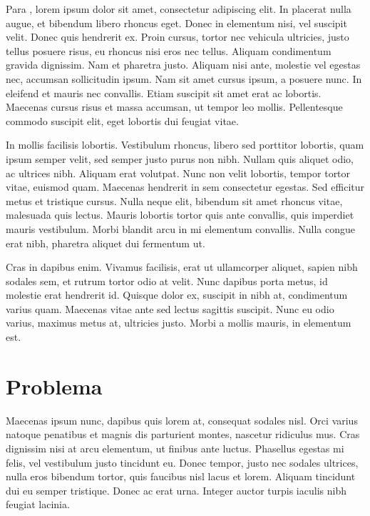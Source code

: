 \documentclass[
	12pt,				%
	a4paper,			%
    openany,
    oneside,
	english,			%
	french,				%
	spanish,			%
	brazil,				%
	]{abntex2}
\begin{document}
Para , lorem ipsum dolor sit amet, consectetur adipiscing elit. In placerat nulla augue, et bibendum libero rhoncus eget. Donec in elementum nisi, vel suscipit velit. Donec quis hendrerit ex. Proin cursus, tortor nec vehicula ultricies, justo tellus posuere risus, eu rhoncus nisi eros nec tellus. Aliquam condimentum gravida dignissim. Nam et pharetra justo. Aliquam nisi ante, molestie vel egestas nec, accumsan sollicitudin ipsum. Nam sit amet cursus ipsum, a posuere nunc. In eleifend et mauris nec convallis. Etiam suscipit sit amet erat ac lobortis. Maecenas cursus risus et massa accumsan, ut tempor leo mollis. Pellentesque commodo suscipit elit, eget lobortis dui feugiat vitae.

In mollis facilisis lobortis. Vestibulum rhoncus, libero sed porttitor lobortis, quam ipsum semper velit, sed semper justo purus non nibh. Nullam quis aliquet odio, ac ultrices nibh. Aliquam erat volutpat. Nunc non velit lobortis, tempor tortor vitae, euismod quam. Maecenas hendrerit in sem consectetur egestas. Sed efficitur metus et tristique cursus. Nulla neque elit, bibendum sit amet rhoncus vitae, malesuada quis lectus. Mauris lobortis tortor quis ante convallis, quis imperdiet mauris vestibulum. Morbi blandit arcu in mi elementum convallis. Nulla congue erat nibh, pharetra aliquet dui fermentum ut.

Cras in dapibus enim. Vivamus facilisis, erat ut ullamcorper aliquet, sapien nibh sodales sem, et rutrum tortor odio at velit. Nunc dapibus porta metus, id molestie erat hendrerit id. Quisque dolor ex, suscipit in nibh at, condimentum varius quam. Maecenas vitae ante sed lectus sagittis suscipit. Nunc eu odio varius, maximus metus at, ultricies justo. Morbi a mollis mauris, in elementum est. 

\section{Problema}

Maecenas ipsum nunc, dapibus quis lorem at, consequat sodales nisl. Orci varius natoque penatibus et magnis dis parturient montes, nascetur ridiculus mus. Cras dignissim nisi at arcu elementum, ut finibus ante luctus. Phasellus egestas mi felis, vel vestibulum justo tincidunt eu. Donec tempor, justo nec sodales ultrices, nulla eros bibendum tortor, quis faucibus nisl lacus et lorem. Aliquam tincidunt dui eu semper tristique. Donec ac erat urna. Integer auctor turpis iaculis nibh feugiat lacinia.
\end{document}

